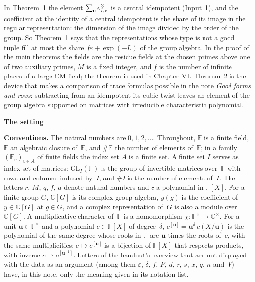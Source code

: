 \documentclass[11pt,a4paper]{article}
\newcommand{\F}{\mathbb{F}}
\newcommand{\m}[1]{\mbox{$#1$}}        %
\newcommand{\sect}[2]{\refstepcounter{section}\label{#2}\par\addvspace{19pt plus 4pt minus 2pt}\Needspace{7\baselineskip}%
  \noindent\llap{{\fontsize{13.2}{16}\selectfont\bfseries\color{inkfaint}\thesection}\hspace{9pt}}%
  {\fontsize{13.2}{16}\selectfont\bfseries\color{ink}#1}\par\nopagebreak\vspace{-1pt}}
\theoremstyle{plainx}
\theoremstyle{uprightx}
\newenvironment{conventions}{\par\addvspace{5pt}\noindent\textbf{Conventions.}\enspace\ignorespaces}{\par\addvspace{3pt}}
\begin{document}
In Theorem~1 the element \m{\sum_{\mathbf c}\tupleIdem{I}{\mathbf c}} is a central idempotent (Input~1), and the
coefficient at the identity of a central idempotent is the share of its image in the regular representation: the
dimension of the image divided by the order of the group. So Theorem~1 says that the representations whose type
is not a good tuple fill at most the share \m{f\varepsilon+\exp(-L)} of the group algebra. In the proof of the
main theorems the fields are the residue fields at the chosen primes above one of two auxiliary primes, $M$ is a
fixed integer, and $f$ is the number of infinite places of a large CM field; the theorem is used in
Chapter~VI. Theorem~2 is the device that makes a comparison of trace formulas possible in the note \emph{Good
forms and rows}: subtracting from an idempotent its cubic twist leaves an element of the group algebra supported
on matrices with irreducible characteristic polynomial.

\sect{The setting}{s:setting}
\begin{conventions}\label{c:conventions}
The natural numbers are \m{0,1,2,\dots}. Throughout, $\F$ is a finite field, $\bar{\F}$ an algebraic closure
of~$\F$, and \m{\#\F} the number of elements of~$\F$; in a family \m{(\F_v)_{v\in A}} of finite fields the index
set $A$ is a finite set. A finite set $I$ serves as index set of matrices: \m{\mathrm{GL}_I(\F)} is the group of
invertible matrices over~$\F$ with rows and columns indexed by~$I$, and \m{\#I} is the number of elements of~$I$.
The letters $r$, $M$, $q$, $f$, $a$ denote natural numbers and $c$ a polynomial in \m{\F[X]}. For a finite group
$G$, \m{\mathbb C[G]} is its complex group algebra, $y(g)$ is the coefficient of \m{y\in\mathbb C[G]} at \m{g\in G},
and a complex representation of~$G$ is also a module over \m{\mathbb C[G]}. A multiplicative character of~$\F$ is
a homomorphism \m{\chi\colon\F^\times\to\mathbb C^\times}. For a unit \m{\mathbf{u}\in\F^\times} and a polynomial \m{c\in\F[X]}
of degree~$\delta$, \m{c^{[\mathbf{u}]}=\mathbf{u}^{\delta}\,c(X/\mathbf{u})} is the polynomial of the same degree whose roots in $\bar{\F}$ are
$\mathbf{u}$ times the roots of~$c$, with the same multiplicities; \m{c\mapsto c^{[\mathbf{u}]}} is a bijection of \m{\F[X]} that
respects products, with inverse \m{c\mapsto c^{[\mathbf{u}^{-1}]}}. Letters of the handout's overview that are not
displayed with the data as an argument (among them $\varepsilon$, $\delta$, $f$, $P$, $d$, $r$, $s$, $x$, $q$, $n$ and~$V$) have, in this
note, only the meaning given in its notation list.
\end{conventions}
\end{document}
